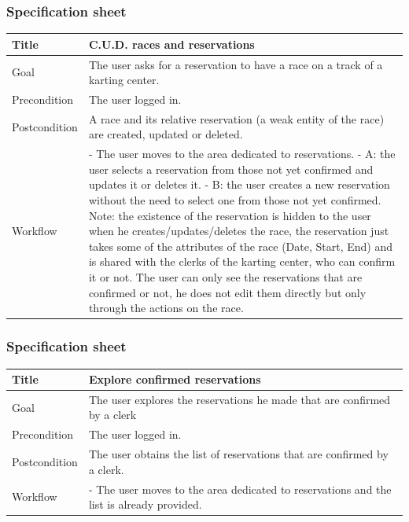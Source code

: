 \documentclass{beamer}
\begin{document}
\begin{frame}
    \frametitle{Specification sheet}
    \begin{table}
        \tiny
        \begin{tabular}{|p{2cm}|p{6cm}|}
        \hline
        Title & \textbf{C.U.D. races and reservations} \\
        \hline
        Goal & The user asks for a reservation to have a race on a track of a karting center. \\
        \hline
        Precondition & The user logged in. \\
        \hline
        Postcondition & A race and its relative reservation (a weak entity of the race) are created, updated or deleted. \\
        \hline
        Workflow &
        - The user moves to the area dedicated to reservations. \newline
        - A: the user selects a reservation from those not yet confirmed and updates it or deletes it. \newline
        - B: the user creates a new reservation without the need to select one from those not yet confirmed. \newline
        Note: the existence of the reservation is hidden to the user when he creates/updates/deletes the race,
        the reservation just takes some of the attributes of the race (Date, Start, End) and is shared with the clerks
        of the karting center, who can confirm it or not. The user can only see the reservations that are
        confirmed or not, he does not edit them directly but only through the actions on the race. \\
        \hline
        \end{tabular}
\end{table}
\end{frame}


\begin{frame}
    \frametitle{Specification sheet}
    \begin{table}
        \tiny
        \begin{tabular}{|p{2cm}|p{6cm}|}
        \hline
        Title & \textbf{Explore confirmed reservations} \\
        \hline
        Goal & The user explores the reservations he made that are confirmed by a clerk \\
        \hline
        Precondition & The user logged in. \\
        \hline
        Postcondition & The user obtains the list of reservations that are confirmed by a clerk. \\
        \hline
        Workflow &
        - The user moves to the area dedicated to reservations and the list is already provided. \\
        \hline
        \end{tabular}
\end{table}
\end{frame}
\end{document}
